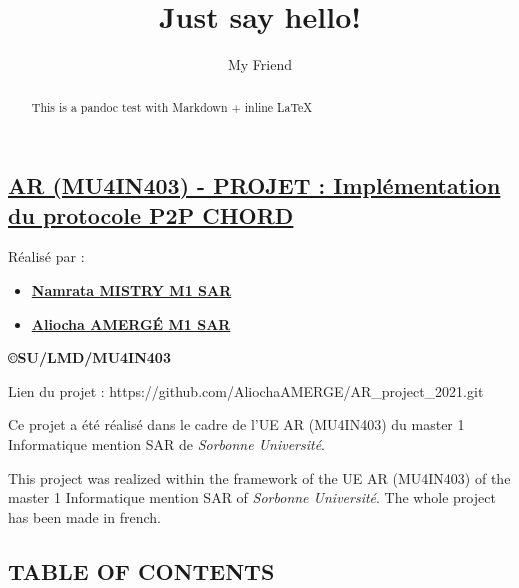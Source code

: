 \documentclass[
]{article}
\title{Just say hello!}
\author{My Friend}
\date{}
\providecommand{\tightlist}{%
  \setlength{\itemsep}{0pt}\setlength{\parskip}{0pt}}
\begin{document}
\maketitle
\begin{abstract}
This is a pandoc test with Markdown + inline LaTeX
\end{abstract}

\hypertarget{ar-mu4in403---projet-impluxe9mentation-du-protocole-p2p-chord}{%
\subsection{\texorpdfstring{\href{https://github.com/AliochaAMERGE/AR_project_2021.git}{AR
(MU4IN403) - PROJET : Implémentation du protocole P2P
CHORD}}{AR (MU4IN403) - PROJET : Implémentation du protocole P2P CHORD}}\label{ar-mu4in403---projet-impluxe9mentation-du-protocole-p2p-chord}}

Réalisé par :

\begin{itemize}
\tightlist
\item
  \href{https://github.com/mnam9807}{\textbf{Namrata MISTRY M1 SAR}}
\item
  \href{https://github.com/AliochaAMERGE}{\textbf{Aliocha AMERGÉ M1
  SAR}}
\end{itemize}

\textbf{©SU/LMD/MU4IN403}

Lien du projet : https://github.com/AliochaAMERGE/AR\_project\_2021.git

Ce projet a été réalisé dans le cadre de l'UE AR (MU4IN403) du master 1
Informatique mention SAR de \emph{Sorbonne Université}.

This project was realized within the framework of the UE AR (MU4IN403)
of the master 1 Informatique mention SAR of \emph{Sorbonne Université}.
The whole project has been made in french.

\hypertarget{table-of-contents}{%
\subsection{TABLE OF CONTENTS}\label{table-of-contents}}
\end{document}
